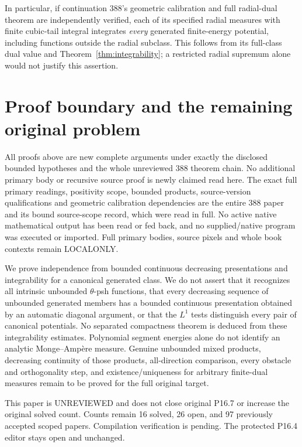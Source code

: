 \documentclass[11pt]{article}
\begin{document}
In particular, if continuation 388's geometric calibration and full
radial-dual theorem are independently verified, each of its specified
radial measures with finite cubic-tail integral integrates \emph{every}
generated finite-energy potential, including functions outside the
radial subclass. This follows from its full-class dual value and
Theorem~\ref{thm:integrability}; a restricted radial supremum alone
would not justify this assertion.

\section{Proof boundary and the remaining original problem}
All proofs above are new complete arguments under exactly the disclosed
bounded hypotheses and the whole unreviewed 388 theorem chain.
No additional primary body or recursive source proof is newly claimed
read here. The exact full primary readings, positivity scope, bounded
products, source-version qualifications and geometric calibration
dependencies are the entire 388 paper and its bound source-scope record,
which were read in full. No active native mathematical output has
been read or fed back, and no supplied/native program was executed
or imported. Full primary bodies, source pixels and whole book contexts
remain LOCALONLY.

We prove independence from bounded continuous decreasing presentations
and integrability for a canonical generated class. We do not assert
that it recognizes all intrinsic unbounded $\theta$-psh functions, that
every decreasing sequence of unbounded generated members has a bounded
continuous presentation obtained by an automatic diagonal argument,
or that the $L^1$ tests distinguish every pair of canonical potentials.
No separated compactness theorem is deduced from these integrability
estimates. Polynomial segment energies alone do not identify an analytic
Monge--Amp\`ere measure. Genuine unbounded mixed products, decreasing
continuity of those products, all-direction comparison, every obstacle
and orthogonality step, and existence/uniqueness for arbitrary finite-dual
measures remain to be proved for the full original target.

This paper is UNREVIEWED and does not close original P16.7 or increase
the original solved count. Counts remain 16 solved, 26 open, and 97
previously accepted scoped papers. Compilation verification is pending.
The protected P16.4 editor stays open and unchanged.
\end{document}
